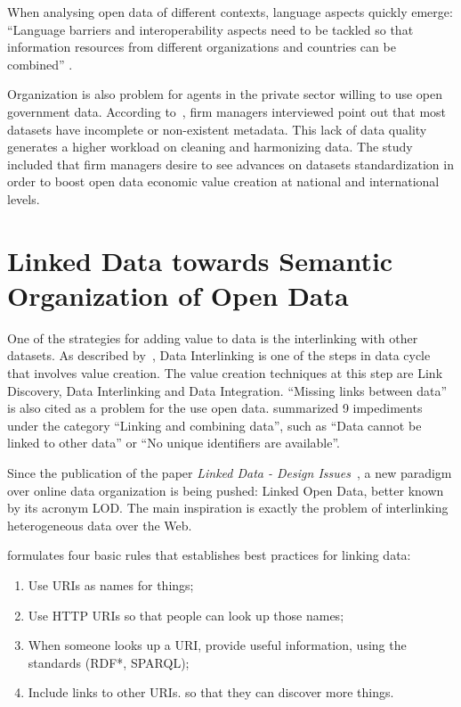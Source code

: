 When analysing open data of different contexts, language aspects quickly emerge: ``Language barriers and interoperability aspects need to be tackled so that information resources from different organizations and countries can be combined'' \cite{Zuiderwijk2012}.

Organization is also problem for agents in the private sector willing to use open government data.
According to~, firm managers interviewed point out that most datasets have incomplete or non-existent metadata.
This lack of data quality generates a higher workload on cleaning and harmonizing data.
The study included that firm managers desire to see advances on datasets standardization in order to boost open data economic value creation at national and international levels.

\section{Linked Data towards Semantic Organization of Open Data}
\label{sec:LOD}

One of the strategies for adding value to data is the interlinking with other datasets.
As described by~, Data Interlinking is one of the steps in data cycle that involves value creation.
The value creation techniques at this step are Link Discovery, Data Interlinking and Data Integration.
``Missing links between data'' is also cited as a problem for the use open data.
 summarized 9 impediments under the category ``Linking and combining data'', such as ``Data cannot be linked to other data'' or ``No unique identifiers are available''.

Since the publication of the paper \emph{Linked Data - Design Issues}~\cite{Berners-Lee2006}, a new paradigm over online data organization is being pushed: Linked Open Data, better known by its acronym LOD.
The main inspiration is exactly the problem of interlinking heterogeneous data over the Web.

 formulates four basic rules that establishes best practices for linking data: 

\begin{enumerate}
	\item Use URIs as names for things;
	\item Use HTTP URIs so that people can look up those names;
	\item When someone looks up a URI, provide useful information, using the standards (RDF*, SPARQL);
	\item Include links to other URIs. so that they can discover more things.
\end{enumerate}

